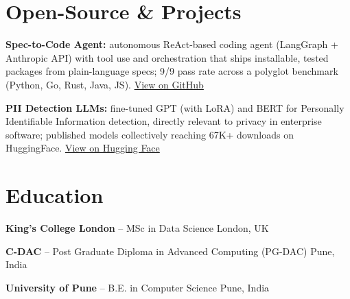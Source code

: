 \documentclass[10pt,a4paper]{article}
\begin{document}
\section{Open-Source \& Projects}
\begin{tight}
  \item \textbf{Spec-to-Code Agent:} autonomous ReAct-based coding agent (LangGraph + Anthropic API) with tool use and orchestration that ships installable, tested packages from plain-language specs; 9/9 pass rate across a polyglot benchmark (Python, Go, Rust, Java, JS). \href{https://github.com/abhijeetscode/Spec-to-Code-Agent}{View on GitHub}
  \item \textbf{PII Detection LLMs:} fine-tuned GPT (with LoRA) and BERT for Personally Identifiable Information detection, directly relevant to privacy in enterprise software; published models collectively reaching 67K+ downloads on HuggingFace. \href{https://huggingface.co/ab-ai/pii_model}{View on Hugging Face}
\end{tight}

\section{Education}
\begin{tight}
  \item {\color{company}\bfseries King's College London} -- MSc in Data Science \hfill {\color{muted}London, UK}
  \item {\color{company}\bfseries C-DAC} -- Post Graduate Diploma in Advanced Computing (PG-DAC) \hfill {\color{muted}Pune, India}
  \item {\color{company}\bfseries University of Pune} -- B.E. in Computer Science \hfill {\color{muted}Pune, India}
\end{tight}
\end{document}
